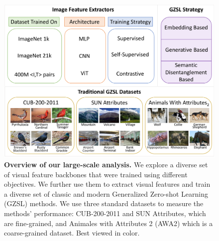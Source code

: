 \begin{table}[ht!]
\caption{
Results of Embedding Based Methods using different features extracted from a diverse set of architecture types pretrained on ImageNet-1k (I-1k) and ImageNet-21k (I-21k)\cite{Imagenet}. These backbones were trained via: supervised and self-supervised (${\dag}$) learning. The bold numbers correspond to the highest scores per column, and the shaded rows correspond to the most performant image feature per method. +FT indicates the features were fine-tuned with the seen classes from the training set.   
}
\label{tab:subset_embedding_based}
\end{table}
\begin{figure}[t!]
    \centering
    \includegraphics[width=\linewidth]{Images/FIG1_CVPR.pdf}
    \caption{\textbf{Overview of our large-scale analysis.} We explore a diverse set of visual feature backbones that were trained using different objectives. We further use them to extract visual features and train a diverse set of classic and modern Generalized Zero-shot Learning (GZSL) methods. We use three standard datasets to measure the methods' performance: CUB-200-2011 and SUN Attributes, which are fine-grained, and Animales with Attributes 2 (AWA2) which is a coarse-grained dataset. Best viewed in color.}
    \label{fig:figure1}
    \vspace{-0.1in}
\end{figure}

